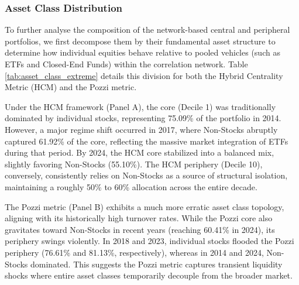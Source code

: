 \documentclass[fleqn]{rbfin}
\begin{document}
\subsubsection{Asset Class Distribution}

\noindent To further analyse the composition of the network-based central and peripheral portfolios, we first decompose them by their fundamental asset structure to determine how individual equities behave relative to pooled vehicles (such as ETFs and Closed-End Funds) within the correlation network. Table \ref{tab:asset_class_extreme} details this division for both the Hybrid Centrality Metric (HCM) and the Pozzi metric.

Under the HCM framework (Panel A), the core (Decile 1) was traditionally dominated by individual stocks, representing 75.09\% of the portfolio in 2014. However, a major regime shift occurred in 2017, where Non-Stocks abruptly captured 61.92\% of the core, reflecting the massive market integration of ETFs during that period. By 2024, the HCM core stabilized into a balanced mix, slightly favoring Non-Stocks (55.10\%). The HCM periphery (Decile 10), conversely, consistently relies on Non-Stocks as a source of structural isolation, maintaining a roughly 50\% to 60\% allocation across the entire decade. 

The Pozzi metric (Panel B) exhibits a much more erratic asset class topology, aligning with its historically high turnover rates. While the Pozzi core also gravitates toward Non-Stocks in recent years (reaching 60.41\% in 2024), its periphery swings violently. In 2018 and 2023, individual stocks flooded the Pozzi periphery (76.61\% and 81.13\%, respectively), whereas in 2014 and 2024, Non-Stocks dominated. This suggests the Pozzi metric captures transient liquidity shocks where entire asset classes temporarily decouple from the broader market.
\end{document}
